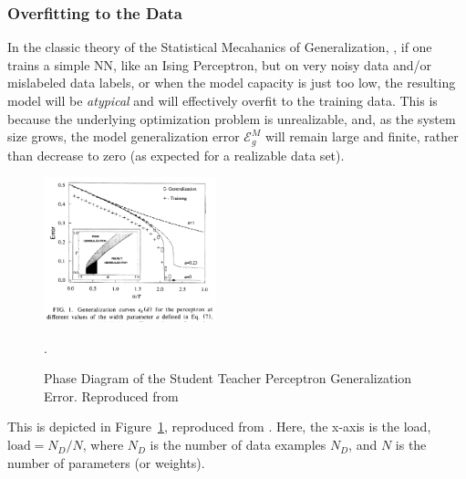\subsubsection{Overfitting to the Data}
\label{sxn:overfitting}


In the classic theory of the Statistical Mecahanics of Generalization, \SMOG, if one
trains a simple NN, like an Ising Perceptron, but on very noisy data and/or mislabeled data labels,
or when the model capacity is just too low, the resulting model will be \emph{atypical}
and will effectively overfit to the training data.
This is because the underlying optimization problem is  unrealizable, and,
as the system size grows, the model generalization error $\mathcal{E}^{M}_{g}$ will
remain large and finite, rather than decrease to zero (as expected for a realizable data set).

\begin{figure}[h]
    \centering
    \includegraphics[width=5cm]{./img/SST90-Figure.png}
    \caption{Phase Diagram of the Student Teacher Perceptron Generalization Error. Reproduced from \cite{SST90}}.
   \label{fig:phase_diagram}
\end{figure}


This is depicted in Figure~\ref{fig:phase_diagram}, reproduced from \cite{SST90}.
Here, the x-axis is the load, $\text{load}=N_{D}/N$,
where $N_{D}$ is the number of data examples $N_{D}$, and $N$ is the number of parameters (or weights).

